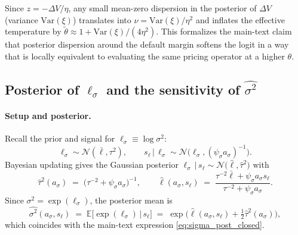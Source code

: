 \documentclass[12pt]{article}
\theoremstyle{plain}
\newcommand{\E}{\mathbb{E}}
\newcommand{\Var}{\mathrm{Var}}
\begin{document}
\noindent Since $z=-\Delta V/\eta$, any small mean-zero dispersion in the
posterior of $\Delta V$ (variance $\Var(\xi)$) translates into
$\nu=\Var(\xi)/\eta^2$ and inflates the effective temperature by
$\tilde\theta\approx 1+\Var(\xi)/(4\eta^2)$. This formalizes the main-text
claim that posterior dispersion around the default margin softens the logit in a
way that is locally equivalent to evaluating the same pricing operator at a
higher $\theta$.

\subsection{Posterior of \texorpdfstring{$\ell_\sigma$}{ell-sigma} and the sensitivity of \texorpdfstring{$\widehat{\sigma^2}$}{sigma-hat-squared}}\label{app:sigma_posterior_mechanics}
\paragraph{Setup and posterior.} Recall the prior and signal for $\ell_\sigma\equiv\log\sigma^2$:
\[
	\ell_\sigma\sim\mathcal N(\bar\ell,\tau^2),\qquad s_\ell\,|\,\ell_\sigma\sim\mathcal N\big(\ell_\sigma,(\psi_\sigma a_\sigma)^{-1}\big).
\]
Bayesian updating gives the Gaussian posterior
$\ell_\sigma\,|\,s_\ell\sim\mathcal N\big(\hat\ell,\hat\tau^2\big)$ with
\begin{equation}\label{eq:post_tau_ell}
	\hat\tau^2(\!a_\sigma\!)\;=\;\big(\tau^{-2}+\psi_\sigma a_\sigma\big)^{-1},\qquad \hat\ell(a_\sigma,s_\ell)\;=\;\frac{\tau^{-2}\bar\ell+\psi_\sigma a_\sigma s_\ell}{\tau^{-2}+\psi_\sigma a_\sigma}.
\end{equation}
Since $\sigma^2=\exp(\ell_\sigma)$, the posterior mean is
\begin{equation}\label{eq:sigma_post_appendix}
	\widehat{\sigma^2}(a_\sigma,s_\ell)\;=\;\E\big[\exp(\ell_\sigma)\,\big|\,s_\ell\big]\;=\;\exp\!\Big(\hat\ell(a_\sigma,s_\ell)+\tfrac12\hat\tau^2(a_\sigma)\Big),
\end{equation}
which coincides with the main-text expression \eqref{eq:sigma_post_closed}.
\end{document}
